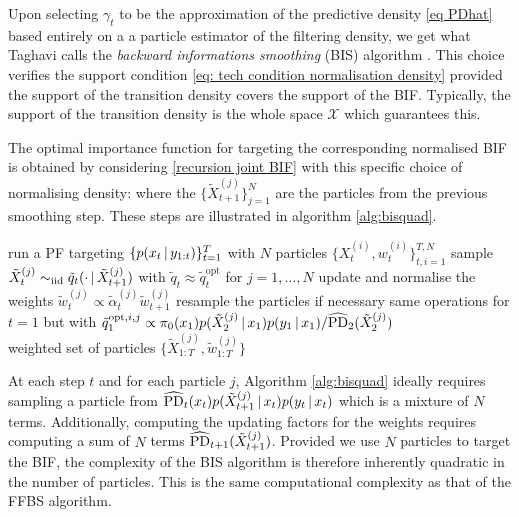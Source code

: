 Upon selecting $\gamma_{t}$ to be the approximation of the predictive density \eqref{eq PDhat} based entirely on a a particle estimator of the filtering density, we get what Taghavi calls the \emph{backward informations smoothing} (BIS) algorithm \citet{taghavi12}. This choice verifies the support condition \eqref{eq: tech condition normalisation density} provided the support  of the transition density covers the support of the BIF. Typically, the support of the transition density is the whole space $\mathcal X$ which guarantees this.

The optimal importance function for targeting the corresponding normalised BIF is obtained by considering \eqref{recursion joint BIF} with this specific choice of normalising density:
where the $\{\tilde X_{t+1}^{(j)}\}_{j=1}^{N}$ are the particles from the previous smoothing step. These steps are illustrated in algorithm \ref{alg:bisquad}.

%
\begin{algorithm}[!h]\small
	\caption{\label{alg:bisquad}}
	\begin{algorithmic}[1]
		\State run a PF targeting $\{p(x_{t}\,|\, y_{1:t})\}_{t=1}^{T}$ with $N$ particles $\{X^{(i)}_{t}, w^{(i)}_{t}\}_{t,i=1}^{T,N}$
			\State sample $\tilde X^{(j)}_{t}\sim_{\mathrm{iid}} \tilde q_{t}(\cdot\,|\, \tilde X^{(j)}_{t+1})$ with $\tilde q_{t}\approx \tilde q_{t}^{\text{opt}}$ for $j=1,\dots,N$
			\State update and normalise the weights $\tilde w^{(j)}_{t}\propto \tilde\alpha^{(j)}_{t}\tilde w^{(j)}_{t+1}$
			\State resample the particles if necessary
		\EndFor
		\State same operations for $t=1$ but with $\tilde q^{\text{opt},i,j}_{1} \propto \pi_{0}(x_{1})p(\tilde X^{(j)}_{2}\,|\, x_{1})p(y_{1}\,|\, x_{1})/\widehat{\text{PD}}_{2}(\tilde X^{(j)}_{2})$\\

		\Return weighted set of particles $\{\tilde X^{(j)}_{1:T}, \tilde w^{(j)}_{1:T}\}$
	\end{algorithmic}
\end{algorithm}
%

At each step $t$ and for each particle $j$, Algorithm \ref{alg:bisquad} ideally requires sampling a particle from $\widehat{\text{PD}}_{t}(x_{t})p(\tilde X^{(j)}_{t+1}\,|\, x_{t})p(y_{t}\,|\, x_{t})$ which is a mixture of $N$ terms. Additionally, computing the updating factors for the weights requires computing a sum of $N$ terms $\widehat{\text{PD}}_{t+1}(\tilde X_{t+1}^{(j)})$. Provided we use $N$ particles to target the BIF, the complexity of the BIS algorithm is therefore inherently quadratic in the number of particles. This is the same computational complexity as that of the FFBS algorithm.

